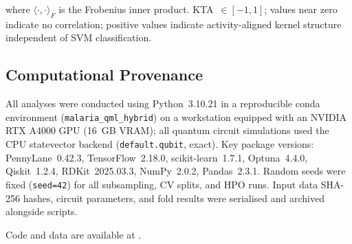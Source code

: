 where $\langle \cdot, \cdot \rangle_F$ is the Frobenius inner product.
KTA~$\in [-1, 1]$; values near zero indicate no correlation; positive
values indicate activity-aligned kernel structure independent of SVM
classification.


\subsection{Computational Provenance}

All analyses were conducted using Python~3.10.21 in a reproducible conda
environment (\texttt{malaria\_qml\_hybrid}) on a workstation equipped with
an NVIDIA RTX A4000 GPU (16~GB VRAM); all quantum circuit simulations used
the CPU statevector backend (\texttt{default.qubit}, exact).
Key package versions: PennyLane~0.42.3\cite{pennylane},
TensorFlow~2.18.0\cite{tensorflow2015},
scikit-learn~1.7.1\cite{sklearn},
Optuna~4.4.0\cite{akiba2019optuna},
Qiskit~1.2.4\cite{qiskit},
RDKit~2025.03.3\cite{rdkit},
NumPy~2.0.2,
Pandas~2.3.1.
Random seeds were fixed (\texttt{seed=42}) for all subsampling, CV splits,
and HPO runs. Input data SHA-256 hashes, circuit parameters, and fold
results were serialised and archived alongside scripts.

Code and data are available at .
